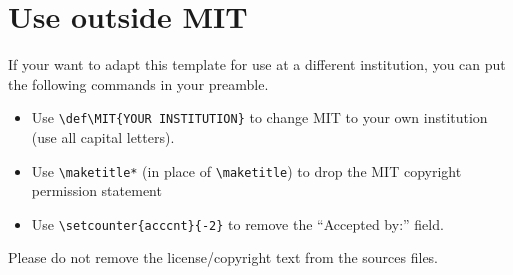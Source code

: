 \documentclass[11pt]{article}
\begin{document}
\section*{Use outside MIT}
If your want to adapt this template for use at a different institution, you can put the following commands in your preamble.  
\begin{itemize}
\item Use \verb|\def\MIT{YOUR INSTITUTION}| to change MIT to your own institution (use all capital letters).

\item Use \verb|\maketitle*| (in place of \verb|\maketitle|) to drop the MIT copyright permission statement

\item Use \verb|\setcounter{acccnt}{-2}| to remove the ``Accepted by:'' field.
\end{itemize}
Please do not remove the license/copyright text from the sources files.
\end{document}
